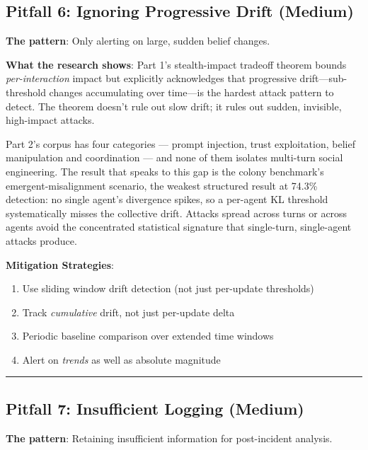 \documentclass[
]{article}
\newcounter{none} %
\providecommand{\tightlist}{%
  \setlength{\itemsep}{0pt}\setlength{\parskip}{0pt}}
\begin{document}
\subsection{Pitfall 6: Ignoring Progressive Drift
(Medium)}\label{pitfall-6-ignoring-progressive-drift-medium}

\textbf{The pattern}: Only alerting on large, sudden belief changes.

\textbf{What the research shows}: Part 1's stealth-impact tradeoff
theorem bounds \emph{per-interaction} impact but explicitly acknowledges
that progressive drift---sub-threshold changes accumulating over
time---is the hardest attack pattern to detect. The theorem doesn't rule
out slow drift; it rules out sudden, invisible, high-impact attacks.

Part 2's corpus has four categories --- prompt injection, trust
exploitation, belief manipulation and coordination --- and none of them
isolates multi-turn social engineering. The result that speaks to this
gap is the colony benchmark's emergent-misalignment scenario, the
weakest structured result at 74.3\% detection: no single agent's
divergence spikes, so a per-agent KL threshold systematically misses the
collective drift. Attacks spread across turns or across agents avoid the
concentrated statistical signature that single-turn, single-agent
attacks produce.

\textbf{Mitigation Strategies}:

\begin{enumerate}
\def\labelenumi{\arabic{enumi}.}
\tightlist
\item
  Use sliding window drift detection (not just per-update thresholds)
\item
  Track \emph{cumulative} drift, not just per-update delta
\item
  Periodic baseline comparison over extended time windows
\item
  Alert on \emph{trends} as well as absolute magnitude
\end{enumerate}

\begin{center}\rule{0.5\linewidth}{0.5pt}\end{center}

\subsection{Pitfall 7: Insufficient Logging
(Medium)}\label{pitfall-7-insufficient-logging-medium}

\textbf{The pattern}: Retaining insufficient information for
post-incident analysis.
\end{document}
